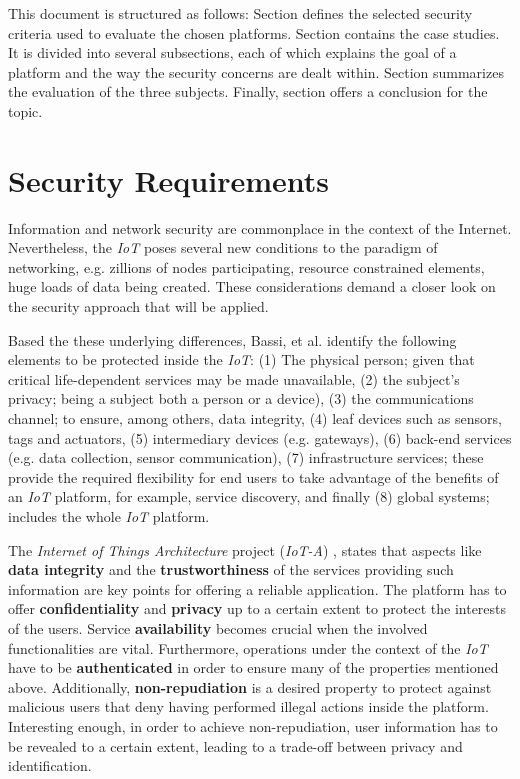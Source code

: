 \documentclass[journal]{IEEEtran}
\begin{document}
  This document is structured as follows: Section \uppercase\expandafter{} defines the selected security criteria used to evaluate the chosen platforms. Section \uppercase\expandafter{} contains the case studies. It is divided into several subsections, each of which explains the goal of a platform and the way the security concerns are dealt within. Section \uppercase\expandafter{} summarizes the evaluation of the three subjects. Finally, section \uppercase\expandafter{} offers a conclusion for the topic.

\section{Security Requirements}
  Information and network security are commonplace in the context of the Internet. Nevertheless, the \emph{IoT} poses several new conditions to the paradigm of networking, e.g. zillions of nodes participating, resource constrained elements, huge loads of data being created. These considerations demand a closer look on the security approach that will be applied.

  Based the these underlying differences, Bassi, et al. \cite{Bassi2013} identify the following elements to be protected inside the \emph{IoT}: (1) The physical person; given that critical life-dependent services may be made unavailable, (2) the subject's privacy; being a subject both a person or a device), (3) the communications channel; to ensure, among others, data integrity, (4) leaf devices such as sensors, tags and actuators, (5) intermediary devices (e.g. gateways), (6) back-end services (e.g. data collection, sensor communication), (7) infrastructure services; these provide the required flexibility for end users to take advantage of the benefits of an \emph{IoT} platform, for example, service discovery, and finally (8) global systems; includes the whole \emph{IoT} platform.

  The \emph{Internet of Things Architecture} project (\emph{IoT-A}) \cite{Salinas2013}, states that aspects like \textbf{data integrity} and the \textbf{trustworthiness} of the services providing such information are key points for offering a reliable application. The platform has to offer \textbf{confidentiality} and \textbf{privacy} up to a certain extent to protect the interests of the users. Service \textbf{availability} becomes crucial when the involved functionalities are vital. Furthermore, operations under the context of the \emph{IoT} have to be \textbf{authenticated} in order to ensure many of the properties mentioned above. Additionally, \textbf{non-repudiation} is a desired property to protect against malicious users that deny having performed illegal actions inside the platform. Interesting enough, in order to achieve non-repudiation, user information has to be revealed to a certain extent, leading to a trade-off between privacy and identification.
\end{document}
